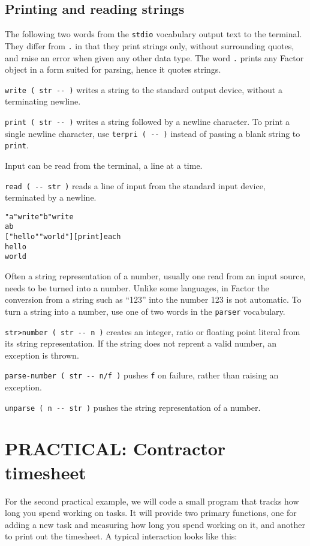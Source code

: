 \documentclass[english]{article}
\begin{document}
\subsection{Printing and reading strings}

The following two words from the \texttt{stdio} vocabulary output text to the terminal. They differ from \texttt{.}
in that they print strings only, without surrounding quotes, and raise
an error when given any other data type. The word \texttt{.} prints any Factor
object in a form suited for parsing, hence it quotes strings.

\texttt{write ( str -{}- )} writes a string to the standard output
device, without a terminating newline.

\texttt{print ( str -{}- )} writes a string followed by a newline
character. To print a single newline character, use \texttt{terpri (
-{}- )} instead of passing a blank string to \texttt{print}.

Input can be read from the terminal, a line at a time.

\texttt{read ( -{}- str )} reads a line of input from the standard
input device, terminated by a newline.

\begin{alltt}
"a" write "b" write
ab
{[} "hello" "world" {]} {[} print {]} each
hello
world
\end{alltt}
Often a string representation of a number, usually one read from an
input source, needs to be turned into a number. Unlike some languages,
in Factor the conversion from a string such as {}``123'' into the
number 123 is not automatic. To turn a string into a number, use one
of two words in the \texttt{parser} vocabulary.

\texttt{str>number ( str -{}- n )} creates an integer, ratio or floating
point literal from its string representation. If the string does not
reprent a valid number, an exception is thrown.

\texttt{parse-number ( str -{}- n/f )} pushes \texttt{f} on failure, rather
than raising an exception.

\texttt{unparse ( n -{}- str )} pushes the string representation of
a number.


\section{PRACTICAL: Contractor timesheet}

For the second practical example, we will code a small program that tracks how long you spend working on tasks. It will provide two primary functions, one for adding a new task and measuring how long you spend working on it, and another to print out the timesheet. A typical interaction looks like this:
\end{document}

